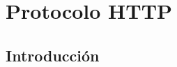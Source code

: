\documentclass[a4paper,slidestop,xcolor=pst,blue]{beamer}
\begin{document}
%
%
%
%
%
%
%
%
%

\section{Protocolo HTTP}

\subsection{Introducción}
\end{document}
